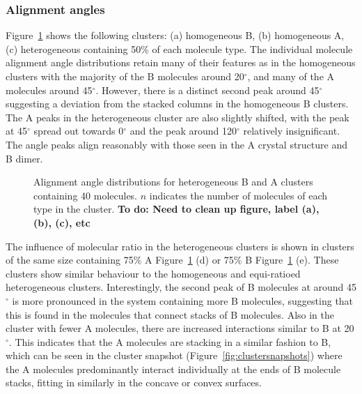 \subsubsection{Alignment angles}
Figure~\ref{fig:alignmentangles_hetero} shows the following clusters: (a) homogeneous B, (b) homogeneous A, (c) heterogeneous containing 50\% of each molecule type. The individual molecule alignment angle distributions retain many of their features as in the homogeneous clusters with the majority of the B molecules around 20$^{\circ}$, and many of the A molecules around 45$^{\circ}$.  However, there is a distinct second peak around 45$^{\circ}$ suggesting a deviation from the stacked columns in the homogeneous B clusters. The A peaks in the heterogeneous cluster are also slightly shifted, with the peak at 45$^{\circ}$ spread out towards 0$^{\circ}$ and the peak around 120$^{\circ}$ relatively insignificant.
The angle peaks align reasonably with those seen in the A crystal structure and B dimer. %
%
\begin{figure}[!tbh]
\centering
\caption{Alignment angle distributions for heterogeneous B and A clusters containing 40 molecules. $n$ indicates the number of molecules of each type in the cluster. \textbf{To do: Need to clean up figure, label (a), (b), (c), etc}}
\label{fig:alignmentangles_hetero}
\end{figure}
%

The influence of molecular ratio in the heterogeneous clusters is shown in clusters of the same size containing 75\% A Figure~\ref{fig:alignmentangles_hetero} (d) or 75\% B Figure~\ref{fig:alignmentangles_hetero} (e). These clusters show similar behaviour to the homogeneous and equi-ratioed heterogeneous clusters.  Interestingly, the second peak of B molecules at around 45$^{\circ}$ is more pronounced in the system containing more B molecules, suggesting that this is found in the molecules that connect stacks of B molecules.  Also in the cluster with fewer A molecules, there are increased interactions similar to B at 20$^{\circ}$. This indicates that the A molecules are stacking in a similar fashion to B, which can be seen in the cluster snapshot (Figure~\ref{fig:clustersnapshots}) where the A molecules predominantly interact individually at the ends of B molecule stacks, fitting in similarly in the concave or convex surfaces.

